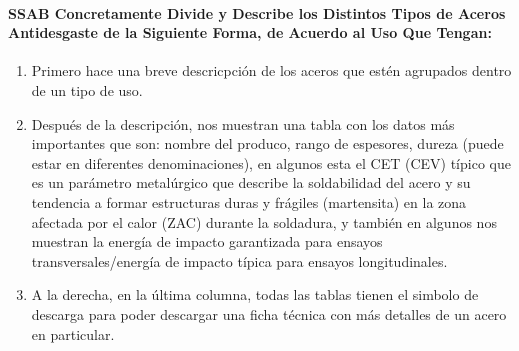 \documentclass[12pt,a4paper]{article}
\begin{document}
\paragraph{SSAB Concretamente Divide y Describe los Distintos Tipos de Aceros Antidesgaste de la Siguiente Forma, de Acuerdo al Uso Que Tengan:}

\begin{enumerate}
    \item Primero hace una breve descricpción de los aceros que estén agrupados dentro de un tipo de uso.
    \item Después de la descripción, nos muestran una tabla con los datos más importantes que son: nombre del produco, rango de espesores, dureza (puede estar en diferentes denominaciones), en algunos esta el CET (CEV) típico que es un parámetro metalúrgico que describe la soldabilidad del acero y su tendencia a formar estructuras duras y frágiles (martensita) en la zona afectada por el calor (ZAC) durante la soldadura, y también en algunos nos muestran la energía de impacto garantizada para ensayos transversales/energía de impacto típica para ensayos longitudinales.
    \item A la derecha, en la última columna, todas las tablas tienen el simbolo de descarga para poder descargar una ficha técnica con más detalles de un acero en particular.
\end{enumerate}
\end{document}
